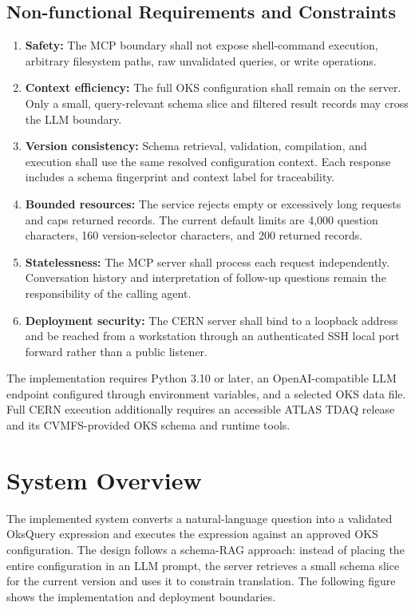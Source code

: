 \documentclass[12pt, a4paper]{report}
\begin{document}
\subsection{Non-functional Requirements and Constraints}
\begin{enumerate}[label=\textbf{\Roman*)}, leftmargin=*]
  \item \textbf{Safety:} The MCP boundary shall not expose shell-command execution, arbitrary filesystem paths, raw unvalidated queries, or write operations.
  \item \textbf{Context efficiency:} The full OKS configuration shall remain on the server. Only a small, query-relevant schema slice and filtered result records may cross the LLM boundary.
  \item \textbf{Version consistency:} Schema retrieval, validation, compilation, and execution shall use the same resolved configuration context. Each response includes a schema fingerprint and context label for traceability.
  \item \textbf{Bounded resources:} The service rejects empty or excessively long requests and caps returned records. The current default limits are 4,000 question characters, 160 version-selector characters, and 200 returned records.
  \item \textbf{Statelessness:} The MCP server shall process each request independently. Conversation history and interpretation of follow-up questions remain the responsibility of the calling agent.
  \item \textbf{Deployment security:} The CERN server shall bind to a loopback address and be reached from a workstation through an authenticated SSH local port forward rather than a public listener.
\end{enumerate}

The implementation requires Python 3.10 or later, an OpenAI-compatible LLM endpoint configured through environment variables, and a selected OKS data file. Full CERN execution additionally requires an accessible ATLAS TDAQ release and its CVMFS-provided OKS schema and runtime tools.

\section{System Overview}

The implemented system converts a natural-language question into a validated OksQuery expression and executes the expression against an approved OKS configuration. The design follows a schema-RAG approach: instead of placing the entire configuration in an LLM prompt, the server retrieves a small schema slice for the current version and uses it to constrain translation. The following figure shows the implementation and deployment boundaries.
\end{document}
